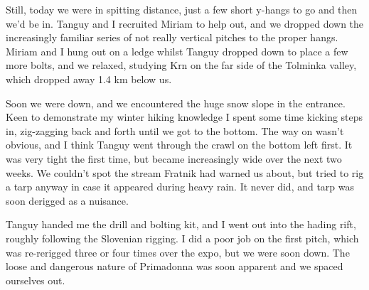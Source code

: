 Still, today we were in spitting distance, just a few short y-hangs to go and then we’d be in. Tanguy and I recruited Miriam to help out, and we dropped down the increasingly familiar series of not really vertical pitches to the proper hangs. Miriam and I hung out on a ledge whilst Tanguy dropped down to place a few more bolts, and we relaxed, studying Krn on the far side of the Tolminka valley, which dropped away 1.4 km below us.

\begin{figure}[b!]
\end{figure}

Soon we were down, and we encountered the huge snow slope in the entrance. Keen to demonstrate my winter hiking knowledge I spent some time kicking steps in, zig-zagging back and forth until we got to the bottom. The way on wasn’t obvious, and I think Tanguy went through the crawl on the bottom left first. It was very tight the first time, but became increasingly wide over the next two weeks. We couldn’t spot the stream Fratnik had warned us about, but tried to rig a tarp anyway in case it appeared during heavy rain. It never did, and tarp was soon derigged as a nuisance.




Tanguy handed me the drill and bolting kit, and I went out into the hading rift, roughly following the Slovenian rigging. I did a poor job on the first pitch, which was re-rerigged three or four times over the expo, but we were soon down. The loose and dangerous nature of Primadonna was soon apparent and we spaced ourselves out.

